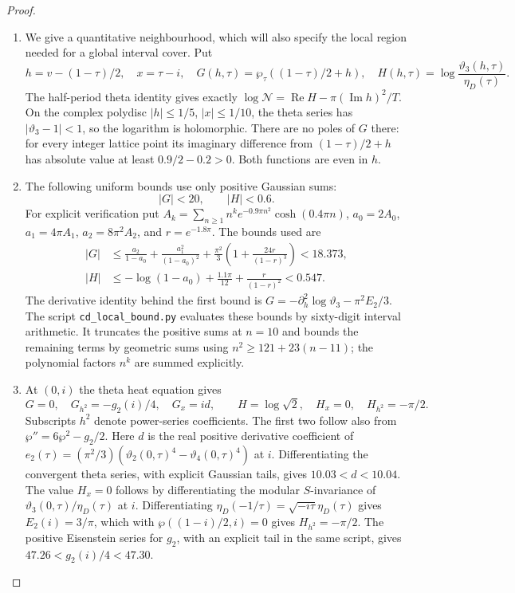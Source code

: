 \begin{proof}
\begin{enumerate}[label=\arabic*.,leftmargin=*]
\item We give a quantitative neighbourhood, which will also specify the local
region needed for a global interval cover. Put
\[
 h=v-(1-\tau)/2,\quad x=\tau-i,\quad
 G(h,\tau)=\wp_\tau((1-\tau)/2+h),\quad
 H(h,\tau)=\log\frac{\vartheta_3(h,\tau)}{\eta_D(\tau)}.
\]
The half-period theta identity gives exactly
$\log\mathcal N=\operatorname{Re}H-\pi(\operatorname{Im}h)^2/T$.
On the complex polydisc $|h|\leq1/5$, $|x|\leq1/10$, the theta series
has $|\vartheta_3-1|<1$, so the logarithm is holomorphic. There are no
poles of $G$ there: for every integer lattice point its imaginary
difference from $(1-\tau)/2+h$ has absolute value at least
$0.9/2-0.2>0$. Both functions are even in $h$.

\item The following uniform bounds use only positive Gaussian sums:
\[
 |G|<20,\qquad |H|<0.6.
\]
For explicit verification put
$A_k=\sum_{n\geq1}n^k e^{-0.9\pi n^2}\cosh(0.4\pi n)$,
$a_0=2A_0$, $a_1=4\pi A_1$, $a_2=8\pi^2A_2$, and $r=e^{-1.8\pi}$.
The bounds used are
\[
 \begin{aligned}
 |G|&\leq\frac{a_2}{1-a_0}+\frac{a_1^2}{(1-a_0)^2}
 +\frac{\pi^2}3\left(1+\frac{24r}{(1-r)^3}\right)<18.373,\\
 |H|&\leq-\log(1-a_0)+\frac{1.1\pi}{12}+
 \frac r{(1-r)^2}<0.547.
 \end{aligned}
\]
The derivative identity behind the first bound is
$G=-\partial_h^2\log\vartheta_3-\pi^2E_2/3$.
The script \texttt{cd\_local\_bound.py} evaluates these bounds by sixty-digit
interval arithmetic. It truncates the positive sums at $n=10$ and bounds
the remaining terms by geometric sums using
$n^2\geq121+23(n-11)$; the polynomial factors $n^k$ are summed explicitly.

\item At $(0,i)$ the theta heat equation gives
\[
 G=0,\quad G_{h^2}=-g_2(i)/4,\quad G_x=id,
 \qquad H=\log\sqrt2,\quad H_x=0,\quad H_{h^2}=-\pi/2.
\]
Subscripts $h^2$ denote power-series coefficients. The first two follow
also from $\wp''=6\wp^2-g_2/2$. Here $d$ is the real positive derivative coefficient of
$e_2(\tau)=(\pi^2/3)(\vartheta_2(0,\tau)^4-
\vartheta_4(0,\tau)^4)$ at $i$. Differentiating the convergent theta
series, with explicit Gaussian tails, gives $10.03<d<10.04$.
The value $H_x=0$ follows by differentiating the modular $S$-invariance
of $\vartheta_3(0,\tau)/\eta_D(\tau)$ at $i$. Differentiating
$\eta_D(-1/\tau)=\sqrt{-i\tau}\eta_D(\tau)$ gives $E_2(i)=3/\pi$,
which with $\wp((1-i)/2,i)=0$ gives $H_{h^2}=-\pi/2$.
The positive Eisenstein series for $g_2$, with an explicit tail in the
same script, gives $47.26<g_2(i)/4<47.30$.


\end{enumerate}
\end{proof}
